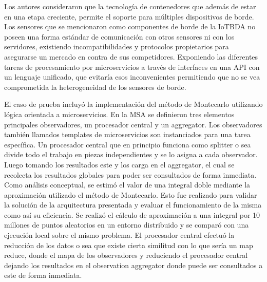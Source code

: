 Los autores consideraron que la tecnología de contenedores que además de estar en una etapa creciente, permite el soporte para múltiples dispositivos de borde.
Los sensores que se mencionaron como componentes de borde de la IoTBDA no poseen una forma estándar de comunicación con otros sensores ni con los servidores, existiendo incompatibilidades y protocolos propietarios para asegurarse un mercado en contra de sus competidores. Exponiendo las diferentes tareas de procesamiento por microservicios a través de  interfaces en una API con un lenguaje unificado, que evitaría esos inconvenientes permitiendo que no se vea comprometida la heterogeneidad de los sensores de borde.\par

El caso de prueba incluyó la implementación del método de Montecarlo utilizando lógica orientada a microservicios.
En la  MSA se definieron tres elementos principales observadores, un procesador central y un aggregator.
Los observadores también llamados templates de microservicios son instanciados para una tarea específica.
Un procesador central que en principio funciona como splitter o sea divide todo el trabajo en piezas independientes y se lo asigna a cada observador.
Luego tomando los resultados este y los carga en el aggregator, el cual se recolecta los resultados globales para poder ser consultados de forma inmediata.
Como análisis conceptual, se estimó el valor de una integral doble mediante la aproximación utilizado el método de Montecarlo. Esto fue realizado para validar la solución de la arquitectura presentada y evaluar el funcionamiento de la misma como así su eficiencia. Se realizó el cálculo de aproximación a una integral por 10 millones de puntos aleatorios en un entorno distribuido y se comparó con una ejecución local sobre el mismo problema.
El procesador central efectuó la reducción de los datos o sea que existe cierta similitud con lo que sería un map reduce, donde el mapa de los observadores y reduciendo el procesador central dejando los resultados en el observation aggregator donde puede ser consultados a este de forma inmediata.\par

